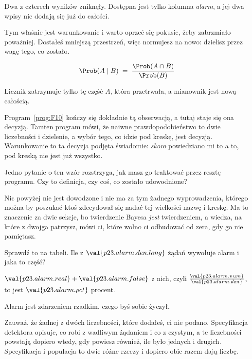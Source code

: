 \begin{fr}
\begin{ansblock}
Dwa z czterech wyników zniknęły. Dostępna jest tylko kolumna \emph{alarm}, a
jej dwa wpisy nie dodają się już do całości.
\end{ansblock}

Tym właśnie jest warunkowanie i warto oprzeć się pokusie, żeby zabrzmiało
poważniej. Dostałeś mniejszą przestrzeń, więc normujesz na nowo: dzielisz
przez wagę tego, co zostało.

\[ \Prob(A \mid B) \;=\; \frac{\Prob(A \cap B)}{\Prob(B)} \]

Licznik zatrzymuje tylko tę część $A$, która przetrwała, a mianownik jest nową
całością.
\end{fr}

\begin{fr}
Program~\ref{prog:F10} kończy się dokładnie tą obserwacją, a tutaj staje się
ona decyzją. Tamten program mówi, że naiwne prawdopodobieństwo to dwie
liczebności i dzielenie, a wybór tego, co idzie pod kreskę, jest decyzją.
Warunkowanie to ta decyzja podjęta świadomie: \emph{skoro} powiedziano mi to a
to, pod kreską nie jest już wszystko.

Jedno pytanie o ten wzór rozstrzyga, jak masz go traktować przez resztę
programu. Czy to definicja, czy coś, co zostało udowodnione?
\dotline
\nextframe
\end{fr}

\begin{fr}

\begin{warning}
Nic powyżej nie jest dowodzone i nie ma za tym żadnego wyprowadzenia, którego
można by poszukać \dash{} ktoś zdecydował się nadać tej wielkości nazwę i
kreskę. Ma to znaczenie za dwie sekcje, bo twierdzenie Bayesa \emph{jest}
twierdzeniem, a wiedza, na które z dwojga patrzysz, mówi ci, które wolno ci
odbudować od zera, gdy go nie pamiętasz.
\end{warning}

Sprawdź to na tabeli. Ile z $\val{p23.alarm.den.long}$ żądań wywołuje alarm i
jaka to część?
\dotline
\nextframe
\end{fr}

\begin{fr}
\begin{ansblock}
$\val{p23.alarm.real} + \val{p23.alarm.false}$ z nich, czyli
$\frac{\val{p23.alarm.num}}{\val{p23.alarm.den}}$, to jest
$\val{p23.alarm.pct}$ procent.
\end{ansblock}

Alarm jest zdarzeniem rzadkim, czego byś sobie życzył.

\begin{note}
Zauważ, że żadnej z dwóch liczebności, które dodałeś, ci nie podano.
Specyfikacja detektora opisuje, co robi z wadliwym żądaniem i co z czystym, a
te liczebności powstają dopiero wtedy, gdy powiesz również, ile było jednych i
drugich. Specyfikacja i populacja to dwie różne rzeczy i dopiero obie razem
dają liczbę.
\end{note}
\end{fr}

